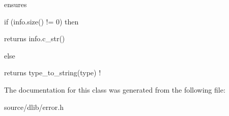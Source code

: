 ensures
\begin{DoxyItemize}
\item if (info.size() != 0) then
\begin{DoxyItemize}
\item returns info.c\_\-str()
\end{DoxyItemize}
\item else
\begin{DoxyItemize}
\item returns type\_\-to\_\-string(type) ! 
\end{DoxyItemize}
\end{DoxyItemize}

The documentation for this class was generated from the following file:\begin{DoxyCompactItemize}
\item 
source/dlib/error.h\end{DoxyCompactItemize}
